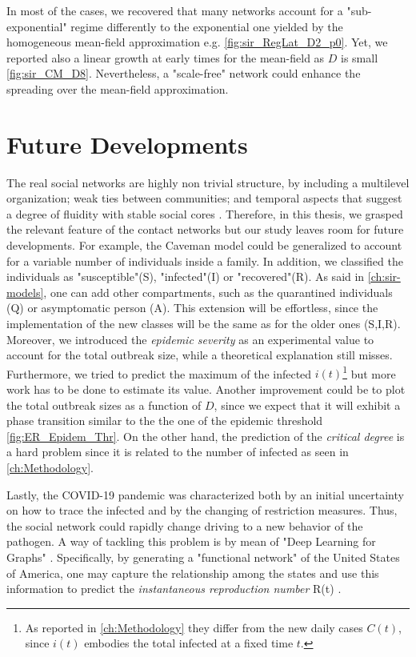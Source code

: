 \documentclass[a4paper,10pt]{book} %
\theoremstyle{definition}
\begin{document}
In most of the cases, we recovered that many networks account for a "sub-exponential" regime differently to the exponential one yielded by the homogeneous mean-field approximation e.g. \autoref{fig:sir_RegLat_D2_p0}. Yet, we reported also a linear growth at early times for the mean-field as $ D$ is small \autoref{fig:sir_CM_D8}. Nevertheless, a "scale-free" network could enhance the spreading over the mean-field approximation.

\section{Future Developments}
The real social networks are highly non trivial structure, by including a multilevel organization; weak ties between communities; and temporal aspects that suggest a degree of fluidity with stable social cores \cite{Thurner::NetBasedExpl}. Therefore, in this thesis, we grasped the relevant feature of the contact networks but our study leaves room for future developments. For example, the Caveman model could be generalized to account for a variable number of individuals inside a family. 
In addition, we classified the individuals as "susceptible"(S), "infected"(I) or "recovered"(R). As said in \autoref{ch:sir-models}, one can add other compartments, such as the quarantined individuals (Q) or asymptomatic person (A). This extension will be effortless, since the implementation of the new classes will be the same as for the older ones (S,I,R).
Moreover, we introduced the \textit{epidemic severity} as an experimental value to account for the total outbreak size, while a theoretical explanation still misses. Furthermore, we tried to predict the maximum of the infected $ i(t)$\footnote{As reported in \autoref{ch:Methodology} they differ from the new daily cases $ C(t)$, since $ i(t)$ embodies the total infected at a fixed time $ t$.} but more work has to be done to estimate its value. Another improvement could be to plot the total outbreak sizes as a function of $ D$, since we expect that it will exhibit a phase transition similar to the the one of the epidemic threshold \autoref{fig:ER_Epidem_Thr}. On the other hand, the prediction of the \textit{critical degree} is a hard problem since it is related to the number of infected as seen in \autoref{ch:Methodology}. 

Lastly, the COVID-19 pandemic was characterized both by an initial uncertainty on how to trace the infected and by the changing of restriction measures. Thus, the social network could rapidly change driving to a new behavior of the pathogen. A way of tackling this problem is by mean of "Deep Learning for Graphs" \cite{Bacciu_Micheli:2020_IntroDGNPisa}. Specifically, by generating a "functional network" of the United States of America, one may capture the relationship among the states and use this information to predict the \textit{instantaneous reproduction number} R(t) \cite{Davahli::USA_predicting_COVID19}.
\end{document}
